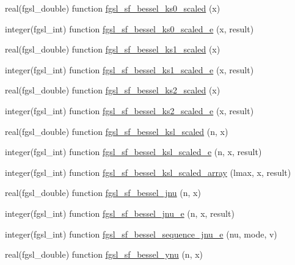 \begin{DoxyCompactItemize}
\item 
real(fgsl\+\_\+double) function \hyperlink{specfunc_8finc_a41c2af16b0cc8e0306bf69674ecd76f8}{fgsl\+\_\+sf\+\_\+bessel\+\_\+ks0\+\_\+scaled} (x)
\item 
integer(fgsl\+\_\+int) function \hyperlink{specfunc_8finc_a036ee716e4369b0904c5283cb0a38866}{fgsl\+\_\+sf\+\_\+bessel\+\_\+ks0\+\_\+scaled\+\_\+e} (x, result)
\item 
real(fgsl\+\_\+double) function \hyperlink{specfunc_8finc_abbd61ad4dae926a7a5ad87a77d80ff83}{fgsl\+\_\+sf\+\_\+bessel\+\_\+ks1\+\_\+scaled} (x)
\item 
integer(fgsl\+\_\+int) function \hyperlink{specfunc_8finc_af142a77938198971f45eb2898c019836}{fgsl\+\_\+sf\+\_\+bessel\+\_\+ks1\+\_\+scaled\+\_\+e} (x, result)
\item 
real(fgsl\+\_\+double) function \hyperlink{specfunc_8finc_ad9186c32d03ac512165c1555935a1d3b}{fgsl\+\_\+sf\+\_\+bessel\+\_\+ks2\+\_\+scaled} (x)
\item 
integer(fgsl\+\_\+int) function \hyperlink{specfunc_8finc_a4fb8e3c619e4c3cb21df907b65e224f2}{fgsl\+\_\+sf\+\_\+bessel\+\_\+ks2\+\_\+scaled\+\_\+e} (x, result)
\item 
real(fgsl\+\_\+double) function \hyperlink{specfunc_8finc_af51da4a346dc5348e883162b1e2a7e34}{fgsl\+\_\+sf\+\_\+bessel\+\_\+ksl\+\_\+scaled} (n, x)
\item 
integer(fgsl\+\_\+int) function \hyperlink{specfunc_8finc_a22e67d04021e66154f4b788f89aabe5e}{fgsl\+\_\+sf\+\_\+bessel\+\_\+ksl\+\_\+scaled\+\_\+e} (n, x, result)
\item 
integer(fgsl\+\_\+int) function \hyperlink{specfunc_8finc_a670c5d38f6b7f68a55eb4c548b55b3e7}{fgsl\+\_\+sf\+\_\+bessel\+\_\+ksl\+\_\+scaled\+\_\+array} (lmax, x, result)
\item 
real(fgsl\+\_\+double) function \hyperlink{specfunc_8finc_a3d7685e959d0f63da798c30a353f1ab7}{fgsl\+\_\+sf\+\_\+bessel\+\_\+jnu} (n, x)
\item 
integer(fgsl\+\_\+int) function \hyperlink{specfunc_8finc_af5b4077bf8637dff5f36872c4f3b5ec7}{fgsl\+\_\+sf\+\_\+bessel\+\_\+jnu\+\_\+e} (n, x, result)
\item 
integer(fgsl\+\_\+int) function \hyperlink{specfunc_8finc_ad369eec1a7deb07c0d9c1b9e51941924}{fgsl\+\_\+sf\+\_\+bessel\+\_\+sequence\+\_\+jnu\+\_\+e} (nu, mode, v)
\item 
real(fgsl\+\_\+double) function \hyperlink{specfunc_8finc_af17a614beaf7642fa1a49fa951d331c0}{fgsl\+\_\+sf\+\_\+bessel\+\_\+ynu} (n, x)
\item 

\end{DoxyCompactItemize}
